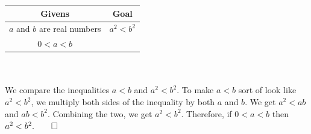 \documentclass[../setup.tex]{subfiles}
\begin{document}
\begin{center}
	\begin{tabular}[t]{| c | c |}
		\hline
		Givens & Goal \\
		\hline
		$a$ and $b$ are real numbers & $a^2 < b ^2$ \\
		$0 < a < b$ &  \\
		\hline
	\end{tabular}
\end{center}
\phantom \\ \\
We compare the inequalities $a < b$ and $a^2 < b^2$. To make $a < b$ sort of look like $a^2 < b^2$, we multiply both sides of the inequality by both $a$ and $b$. We get $a^2 < ab$ and $ab < b^2$. Combining the two, we get $a^2 < b^2$. Therefore, if $0 < a < b$ then $a^2 < b^2. \qed$ \\
\end{document}
